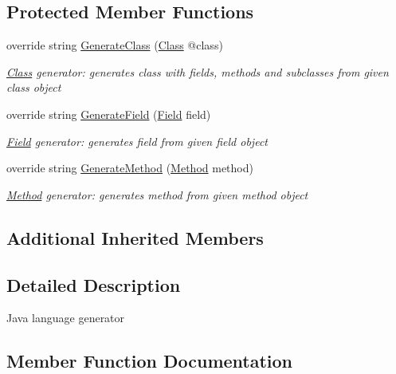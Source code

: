 \subsection*{Protected Member Functions}
\begin{DoxyCompactItemize}
\item 
override string \mbox{\hyperlink{classCodeGen_1_1generators_1_1JavaGenerator_aebc6618c4d20b03195d4dd2a9bd03ffb}{Generate\+Class}} (\mbox{\hyperlink{classCodeGen_1_1generators_1_1Class}{Class}} @class)
\begin{DoxyCompactList}\small\item\em \mbox{\hyperlink{classCodeGen_1_1generators_1_1Class}{Class}} generator\+: generates class with fields, methods and subclasses from given class object  \end{DoxyCompactList}\item 
override string \mbox{\hyperlink{classCodeGen_1_1generators_1_1JavaGenerator_a84c05958d52e40e29a5a2157de4579e2}{Generate\+Field}} (\mbox{\hyperlink{classCodeGen_1_1generators_1_1Field}{Field}} field)
\begin{DoxyCompactList}\small\item\em \mbox{\hyperlink{classCodeGen_1_1generators_1_1Field}{Field}} generator\+: generates field from given field object  \end{DoxyCompactList}\item 
override string \mbox{\hyperlink{classCodeGen_1_1generators_1_1JavaGenerator_a01dca6b9662f50fbd4735dbe97c99cc2}{Generate\+Method}} (\mbox{\hyperlink{classCodeGen_1_1generators_1_1Method}{Method}} method)
\begin{DoxyCompactList}\small\item\em \mbox{\hyperlink{classCodeGen_1_1generators_1_1Method}{Method}} generator\+: generates method from given method object  \end{DoxyCompactList}\end{DoxyCompactItemize}
\subsection*{Additional Inherited Members}


\subsection{Detailed Description}
Java language generator 



\subsection{Member Function Documentation}
\mbox{\label{classCodeGen_1_1generators_1_1JavaGenerator_aebc6618c4d20b03195d4dd2a9bd03ffb}} 
